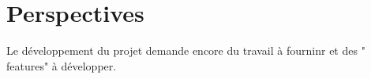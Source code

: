 \chapter{Perspectives}
Le développement du projet demande encore du travail à fourninr et des " features" à développer.
